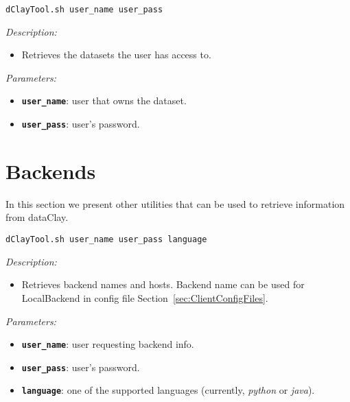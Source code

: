 \begin{dBox}
\texttt{dClayTool.sh  \newline user\_name user\_pass}
\LINE

{\it Description:}

\begin{itemize}
    \item Retrieves the datasets the user has access to.
\end{itemize}

{\it Parameters:}

\begin{itemize}
    \item \texttt{\bfseries user\_name}: user that owns the dataset.
    \item \texttt{\bfseries user\_pass}: user's password.
\end{itemize}

\end{dBox}


\section{Backends}

In this section we present other utilities that can be used to retrieve information from dataClay.


\begin{dBox}
\texttt{dClayTool.sh  user\_name user\_pass language}
\LINE

{\it Description:}

\begin{itemize}
    \item Retrieves backend names and hosts. Backend name can be used for LocalBackend in config file Section~\ref{sec:ClientConfigFiles}.
\end{itemize}

{\it Parameters:}

\begin{itemize}
    \item \texttt{\bfseries user\_name}: user requesting backend info.
    \item \texttt{\bfseries user\_pass}: user's password.
    \item \texttt{\bfseries language}: one of the supported languages (currently, \textit{python} or \textit{java}).
\end{itemize}

\end{dBox}

\FEDERATION{

}
